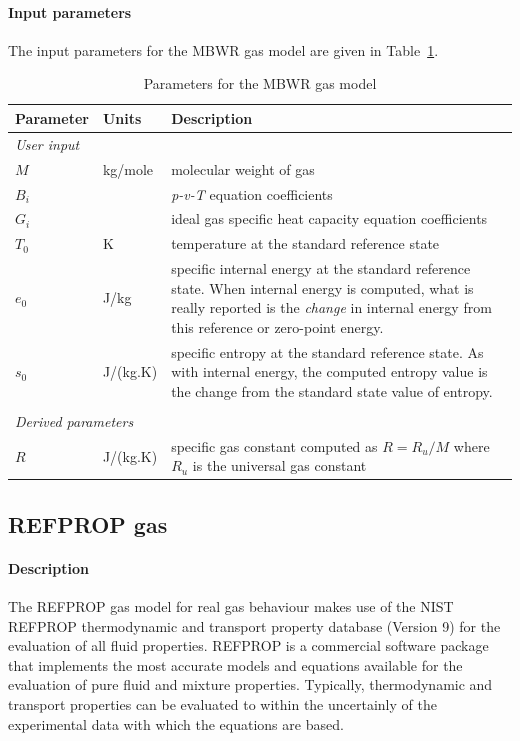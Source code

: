 \paragraph{Input parameters}
The input parameters for the MBWR gas model are given in Table~\ref{tab:MBWR-params}.

\begin{table}[h]
\caption{Parameters for the MBWR gas model}
\label{tab:MBWR-params}
\begin{tabular}{llp{10cm}}
\toprule
Parameter & Units & Description \\ \midrule
\multicolumn{3}{l}{\textit{User input}} \\
$M$       & kg/mole & molecular weight of gas \\
$B_i$     &       & \textit{p-v-T} equation coefficients \\
$G_i$     &       & ideal gas specific heat capacity equation coefficients \\
$T_0$     & K     & temperature at the standard reference state \\
$e_0$     & J/kg   & specific internal energy at the standard reference state.
                    When internal energy is computed, what is really 
                    reported is the \emph{change} in internal energy
                    from this reference or zero-point energy. \\
$s_0$     & J/(kg.K) & specific entropy at the standard reference state.
                       As with internal energy, the computed entropy value
                       is the change from the standard state value of entropy. \\
 & & \\
\multicolumn{3}{l}{\textit{Derived parameters}} \\
$R$      & J/(kg.K) & specific gas constant computed as $R = R_u/M$ where
                      $R_u$ is the universal gas constant \\
\bottomrule
\end{tabular}
\end{table}

\subsection{REFPROP gas}
\label{sec:REFPROP_gas}

\paragraph{Description}
The REFPROP gas model for real gas behaviour makes use of the NIST REFPROP
thermodynamic and transport property database (Version 9) \cite{lemmon2002nist}
for the evaluation of all fluid properties. REFPROP is a commercial software package
that implements the most accurate models and equations available for the
evaluation of pure fluid and mixture properties. Typically, thermodynamic and transport
properties can be evaluated to within the uncertainly of the experimental data with
which the equations are based.

